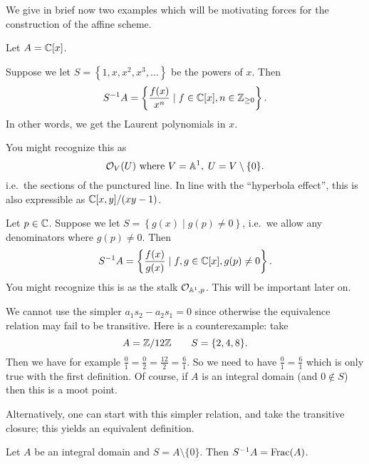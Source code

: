 We give in brief now two examples which will be
motivating forces for the construction of the affine scheme.
\begin{example}
	[Localizations of {$\CC[x]$}]
	Let $A = \mathbb C[x]$.
	\begin{enumerate}[(a)]
		\ii Suppose we let $S = \left\{ 1, x, x^2, x^3, \dots \right\}$
		be the powers of $x$.
		Then
		\[ S^{-1} A = \left\{ \frac{f(x)}{x^n}
			\mid f \in \mathbb C[x], n \in \mathbb Z_{\ge 0} \right\}.  \]
		In other words, we get the Laurent polynomials in $x$.

		You might recognize this as
		\[ \mathcal O_V(U) \text{ where } V = \mathbb A^1, \; U = V \setminus \{0\}. \]
		i.e.\ the sections of the punctured line.
		In line with the ``hyperbola effect'',
		this is also expressible as $\mathbb C[x,y] / (xy-1)$.

		\ii Let $p \in \mathbb C$.
		Suppose we let $S = \left\{ g(x) \mid g(p) \neq 0 \right\}$,
		i.e.\ we allow any denominators where $g(p) \neq 0$.
		Then
		\[ S^{-1} A = \left\{ \frac{f(x)}{g(x)}
			\mid f,g \in \mathbb C[x], g(p) \neq 0 \right\}.  \]
		You might recognize this is as the stalk $\mathcal O_{\mathbb A^1, p}$.
		This will be important later on.
	\end{enumerate}
\end{example}

\begin{remark}
	We cannot use the simpler $a_1s_2 - a_2s_1 = 0$ since
	otherwise the equivalence relation may fail to be transitive.
	Here is a counterexample: take
	\[ A = \mathbb Z/12\mathbb Z \qquad S = \{ 2, 4, 8 \}. \]
	Then we have for example $\frac01 = \frac02 = \frac{12}{2} = \frac61$.
	So we need to have $\frac01=\frac61$ which is only true
	with the first definition.
	Of course, if $A$ is an integral domain (and $0\notin S$) then this is a moot point.

	Alternatively, one can start with this simpler relation,
	and take the transitive closure; this yields an equivalent definition.
\end{remark}

\begin{example}
	Let $A$ be an integral domain and $S = A \setminus \{0\}$.
	Then $S^{-1} A = \operatorname{Frac}(A)$.
\end{example}


